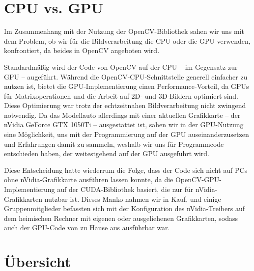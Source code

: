 \documentclass[a4paper,12pt]{report}
\begin{document}
\section{CPU vs. GPU}
	Im Zusammenhang mit der Nutzung der OpenCV-Bibliothek sahen wir uns mit dem Problem, ob wir für die Bildverarbeitung die CPU oder die GPU verwenden, konfrontiert, da beides in OpenCV angeboten wird.

	Standardmäßig wird der Code von OpenCV auf der CPU -- im Gegensatz zur GPU -- augeführt.
	Während die OpenCV-CPU-Schnittstelle generell einfacher zu nutzen ist, bietet die GPU-Implementierung einen Performance-Vorteil, da GPUs für Matrixoperationen und die Arbeit auf 2D- und 3D-Bildern optimiert sind.
	Diese Optimierung war trotz der echtzeitnahen Bildverarbeitung nicht zwingend notwendig.
	Da das Modellauto allerdings mit einer aktuellen Grafikkarte -- der nVidia GeForce GTX 1050Ti -- ausgestattet ist, sahen wir in der GPU-Nutzung eine Möglichkeit, uns mit der Programmierung auf der GPU auseinanderzusetzen und Erfahrungen damit zu sammeln, weshalb wir uns für Programmcode entschieden haben, der weitestgehend auf der GPU ausgeführt wird.

	Diese Entscheidung hatte wiederrum die Folge, dass der Code sich nicht auf PCs ohne nVidia-Grafikkarte ausführen lassen konnte, da die OpenCV-GPU-Implementierung auf der CUDA-Bibliothek basiert, die nur für nVidia-Grafikkarten nutzbar ist.
	Dieses Manko nahmen wir in Kauf, und einige Gruppenmitglieder befassten sich mit der Konfiguration des nVidia-Treibers auf dem heimischen Rechner mit eigenen oder ausgeliehenen Grafikkarten, sodass auch der GPU-Code von zu Hause aus ausführbar war.



\pagebreak

\section{Übersicht}
\end{document}
